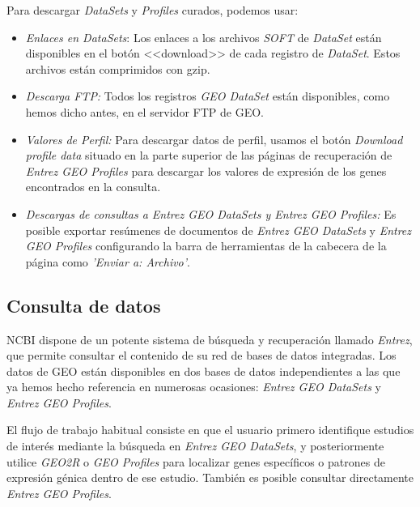 Para descargar \textit{DataSets} y \textit{Profiles} curados, podemos usar:

\begin{itemize}
    \item \textit{Enlaces en DataSets}: Los enlaces a los archivos \textit{SOFT} de \textit{DataSet} están disponibles en el botón <<download>> de cada registro de \textit{DataSet}. Estos archivos están comprimidos
    con gzip.
    \item \textit{Descarga FTP:} Todos los registros \textit{GEO DataSet} están disponibles, como hemos dicho antes, en el servidor FTP de GEO.
    \item \textit{Valores de Perfil:} Para descargar datos de perfil, usamos el botón \textit{Download profile data} situado en la parte superior de las páginas de recuperación de 
    \textit{Entrez GEO Profiles} para descargar los valores de expresión de los genes encontrados en la consulta.
    \item \textit{Descargas de consultas a Entrez GEO DataSets y Entrez GEO Profiles:} Es posible exportar resúmenes de documentos de \textit{Entrez GEO DataSets} y \textit{Entrez GEO Profiles} configurando la barra
    de herramientas de la cabecera de la página como \textit{'Enviar a: Archivo'}.
\end{itemize}

\subsection{Consulta de datos}


NCBI dispone de un potente sistema de búsqueda y recuperación llamado \textit{Entrez}, que permite consultar el contenido de su red de bases de datos integradas. Los datos de GEO están disponibles en dos bases de
datos independientes a las que ya hemos hecho referencia en numerosas ocasiones: \textit{Entrez GEO DataSets} y \textit{Entrez GEO Profiles}. \newline

El flujo de trabajo habitual consiste en que el usuario primero identifique estudios de interés mediante la búsqueda en \textit{Entrez GEO DataSets}, y posteriormente utilice \textit{GEO2R} o \textit{GEO Profiles} para
localizar genes específicos o patrones de expresión génica dentro de ese estudio. También es posible consultar directamente \textit{Entrez GEO Profiles}. \newline

